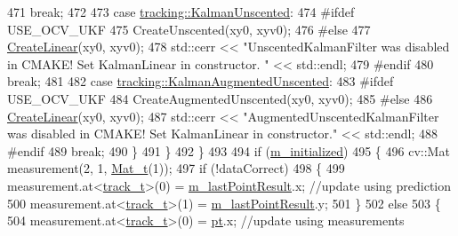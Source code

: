 \begin{DoxyCode}
471                 \textcolor{keywordflow}{break};
472 
473             \textcolor{keywordflow}{case} \mbox{\hyperlink{namespacetracking_a83f2c4d58ea2737f7d6296dce3eb722aa39d914d61ae37e52ad325f55d199dabc}{tracking::KalmanUnscented}}:
474 \textcolor{preprocessor}{#ifdef USE\_OCV\_UKF}
475                 CreateUnscented(xy0, xyv0);
476 \textcolor{preprocessor}{#else}
477                 \mbox{\hyperlink{class_t_kalman_filter_a6b1bb8fb881f82ce0a766e6ea41f159c}{CreateLinear}}(xy0, xyv0);
478                 std::cerr << \textcolor{stringliteral}{"UnscentedKalmanFilter was disabled in CMAKE! Set KalmanLinear in constructor.
      "} << std::endl;
479 \textcolor{preprocessor}{#endif}
480                 \textcolor{keywordflow}{break};
481 
482             \textcolor{keywordflow}{case} \mbox{\hyperlink{namespacetracking_a83f2c4d58ea2737f7d6296dce3eb722aa442bc8be9c68f72f1bc7952153cbf4c7}{tracking::KalmanAugmentedUnscented}}:
483 \textcolor{preprocessor}{#ifdef USE\_OCV\_UKF}
484                 CreateAugmentedUnscented(xy0, xyv0);
485 \textcolor{preprocessor}{#else}
486                 \mbox{\hyperlink{class_t_kalman_filter_a6b1bb8fb881f82ce0a766e6ea41f159c}{CreateLinear}}(xy0, xyv0);
487                 std::cerr << \textcolor{stringliteral}{"AugmentedUnscentedKalmanFilter was disabled in CMAKE! Set KalmanLinear in
       constructor."} << std::endl;
488 \textcolor{preprocessor}{#endif}
489                 \textcolor{keywordflow}{break};
490             \}
491         \}
492     \}
493 
494     \textcolor{keywordflow}{if} (\mbox{\hyperlink{class_t_kalman_filter_a5633e302e878261c8669816695f6a314}{m\_initialized}})
495     \{
496         cv::Mat measurement(2, 1, \mbox{\hyperlink{defines_8h_ab1a8d0e1d0eb73f62b8beee8a243475e}{Mat\_t}}(1));
497         \textcolor{keywordflow}{if} (!dataCorrect)
498         \{
499             measurement.at<\mbox{\hyperlink{defines_8h_a7ce9c8817b42ab418e61756f579549ab}{track\_t}}>(0) = \mbox{\hyperlink{class_t_kalman_filter_a91efb6a00cfae5df3e513ceba2239fa3}{m\_lastPointResult}}.x;  \textcolor{comment}{//update using
       prediction}
500             measurement.at<\mbox{\hyperlink{defines_8h_a7ce9c8817b42ab418e61756f579549ab}{track\_t}}>(1) = \mbox{\hyperlink{class_t_kalman_filter_a91efb6a00cfae5df3e513ceba2239fa3}{m\_lastPointResult}}.y;
501         \}
502         \textcolor{keywordflow}{else}
503         \{
504             measurement.at<\mbox{\hyperlink{defines_8h_a7ce9c8817b42ab418e61756f579549ab}{track\_t}}>(0) = \mbox{\hyperlink{rings_8cpp_af69bbacaaf68a115b351c5d1e29c3cc8}{pt}}.x;  \textcolor{comment}{//update using measurements}

\end{DoxyCode}
